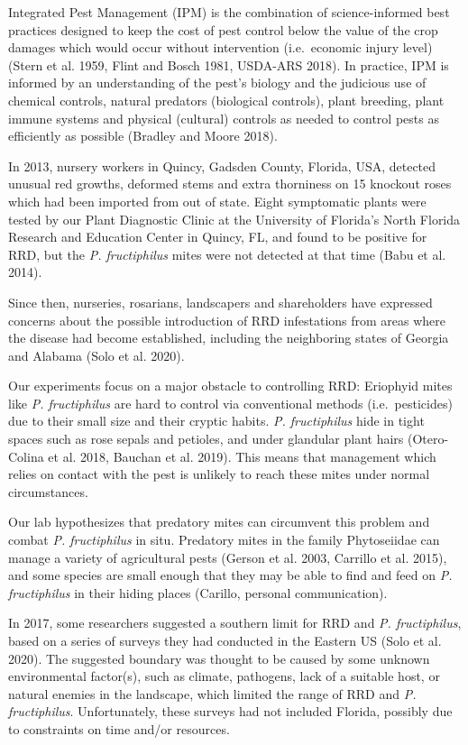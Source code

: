 \documentclass[12pt,final,CPage]{ufthesis}
\begin{document}
{  Integrated Pest Management (IPM) is the combination of science-informed best practices designed to keep the cost of pest control below the value of the crop damages which would occur without intervention (i.e.~economic injury level) (Stern et al. 1959, Flint and Bosch 1981, USDA-ARS 2018). In practice, IPM is informed by an understanding of the pest's biology and the judicious use of chemical controls, natural predators (biological controls), plant breeding, plant immune systems and physical (cultural) controls as needed to control pests as efficiently as possible (Bradley and Moore 2018).

  In 2013, nursery workers in Quincy, Gadsden County, Florida, USA, detected unusual red growths, deformed stems and extra thorniness on 15 knockout roses which had been imported from out of state. Eight symptomatic plants were tested by our Plant Diagnostic Clinic at the University of Florida's North Florida Research and Education Center in Quincy, FL, and found to be positive for RRD, but the \emph{P. fructiphilus} mites were not detected at that time (Babu et al. 2014).

  Since then, nurseries, rosarians, landscapers and shareholders have expressed concerns about the possible introduction of RRD infestations from areas where the disease had become established, including the neighboring states of Georgia and Alabama (Solo et al. 2020).

  Our experiments focus on a major obstacle to controlling RRD: Eriophyid mites like \emph{P. fructiphilus} are hard to control via conventional methods (i.e.~pesticides) due to their small size and their cryptic habits. \emph{P. fructiphilus} hide in tight spaces such as rose sepals and petioles, and under glandular plant hairs (Otero-Colina et al. 2018, Bauchan et al. 2019). This means that management which relies on contact with the pest is unlikely to reach these mites under normal circumstances.

  Our lab hypothesizes that predatory mites can circumvent this problem and combat \emph{P. fructiphilus} in situ. Predatory mites in the family Phytoseiidae can manage a variety of agricultural pests (Gerson et al. 2003, Carrillo et al. 2015), and some species are small enough that they may be able to find and feed on \emph{P. fructiphilus} in their hiding places (Carillo, personal communication).

  In 2017, some researchers suggested a southern limit for RRD and \emph{P. fructiphilus}, based on a series of surveys they had conducted in the Eastern US (Solo et al. 2020). The suggested boundary was thought to be caused by some unknown environmental factor(s), such as climate, pathogens, lack of a suitable host, or natural enemies in the landscape, which limited the range of RRD and \emph{P. fructiphilus}. Unfortunately, these surveys had not included Florida, possibly due to constraints on time and/or resources.

}
\end{document}
